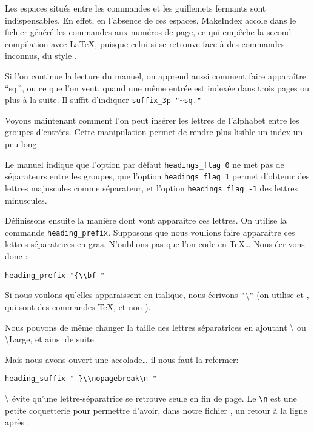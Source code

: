 \begin{attention}
Les espaces situés entre les commandes et les guillemets fermants sont indispensables. En effet, en l'absence de ces espaces, MakeIndex accole dans le fichier  généré les commandes aux numéros de page, ce qui empêche la second compilation avec \LaTeX, puisque celui si se retrouve face à des commandes inconnus, du style .
\end{attention}

Si l'on continue la lecture du manuel, on apprend aussi comment faire apparaître \enquote{sq.}, ou ce que l'on veut, quand une même entrée est indexée dans trois pages ou plus à la suite. Il suffit d'indiquer \verb+suffix_3p "~sq."+

Voyons maintenant comment l'on peut insérer les lettres de l'alphabet entre les groupes d'entrées. Cette manipulation permet de rendre plus lisible un index un peu long. 

Le manuel indique que l'option par défaut \verb+headings_flag 0+ ne met pas de séparateurs entre les groupes, que l'option \verb+headings_flag 1+ permet d'obtenir des lettres majuscules comme séparateur, et l'option  \verb+headings_flag -1+ des lettres minuscules.

Définissons ensuite la manière dont vont apparaître ces lettres. On utilise la commande \verb|heading_prefix|. Supposons que nous voulions faire apparaître ces lettres séparatrices en gras. N'oublions pas que l'on code en \TeX … Nous écrivons donc :

\begin{verbatim}
heading_prefix "{\\bf "
\end{verbatim} 

Si nous voulons qu'elles apparaissent en italique, nous écrivons \verb|"|\textbackslash{}\verb|"| (on utilise  et , qui sont des commandes \TeX, et non  ).

Nous  pouvons de même changer la taille des lettres séparatrices en ajoutant \textbackslash{} ou \cs\textbackslash{Large}, et ainsi de suite. 

Mais nous avons ouvert une accolade… il nous faut la refermer:

\begin{verbatim}
heading_suffix " }\\nopagebreak\n " 
\end{verbatim}

\textbackslash{} évite qu'une lettre-séparatrice se retrouve seule en fin de page. Le \verb|\n| est une petite coquetterie pour permettre d'avoir, dans notre fichier , un retour à la ligne après .



